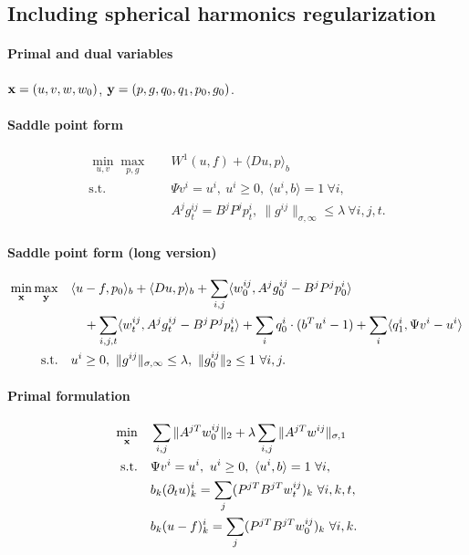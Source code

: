 
\subsection{Including spherical harmonics regularization}

\paragraph{Primal and dual variables}
$\mathbf{x} = (u,v,w,w_0)$, $\mathbf{y} = (p,g,q_0,q_1,p_0,g_0)$.

\paragraph{Saddle point form}
\begin{align*}
    \min_{u,v} \max_{p,g} \quad
        & W^1(u,f) + \langle Du, p \rangle_b \\
    \text{s.t.}\quad
        & \Psi v^i = u^i,
            ~u^i \geq 0, ~\langle u^i, b \rangle = 1 ~\forall i, \\
        & A^j g^{ij}_t = B^j P^j p^i_t,
          ~\|g^{ij}\|_{\sigma,\infty} \leq \lambda ~\forall i,j,t.
\end{align*}

\paragraph{Saddle point form (long version)}
\begin{align*}
    \min_{\mathbf{x}} \max_{\mathbf{y}} \quad
        & \langle u-f, p_0 \rangle_b
            + \langle Du, p \rangle_b
            + \sum_{i,j} \langle w_0^{ij}, A^j g_0^{ij} - B^j P^j p_0^i \rangle
            \\
        &\quad + \sum_{i,j,t} \langle w^{ij}_t, A^j g^{ij}_t - B^j P^j p^i_t \rangle
            + \sum_{i} q_0^i \cdot (b^T u^i - 1)
            + \sum_{i} \langle q_1^i, \Psi v^i - u^i \rangle \\
    \text{s.t.}\quad
        & u^i \geq 0,
            ~\|g^{ij}\|_{\sigma,\infty} \leq \lambda,
            ~\|g_0^{ij}\|_{2} \leq 1 ~\forall i,j.
\end{align*}

\paragraph{Primal formulation}
\begin{align*}
    \min_{\mathbf{x}} \quad
        & \sum_{i,j} \| A^{jT} w_0^{ij} \|_{2}
            + \lambda \sum_{i,j} \| A^{jT} w^{ij} \|_{\sigma,1} \\
    \text{s.t.}\quad
        & \Psi v^i = u^i,
            ~u^i \geq 0, ~\langle u^i, b \rangle = 1 ~\forall i, \\
        & b_k (\partial_t u)_k^i = \sum_j (P^{jT}B^{jT}w^{ij}_t)_{k} ~\forall i,k,t, \\
        & b_k (u - f)_k^i = \sum_j (P^{jT}B^{jT}w_0^{ij})_{k} ~\forall i,k.
\end{align*}

